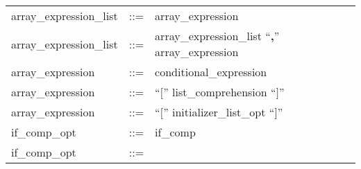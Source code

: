\documentclass[11pt]{article}
\begin{document}
\begin{longtable}{lrl}
array\_expression\_list                    & ::= &
  \begin{minipage}[t]{\rulerhs}
    \raggedright
    array\_expression
  \end{minipage}                                                             \\
array\_expression\_list                    & ::= &
  \begin{minipage}[t]{\rulerhs}
    \raggedright
    array\_expression\_list ``{\bf ,}'' array\_expression
  \end{minipage}                                                             \\
array\_expression                          & ::= &
  \begin{minipage}[t]{\rulerhs}
    \raggedright
    conditional\_expression
  \end{minipage}                                                             \\
array\_expression                          & ::= &
  \begin{minipage}[t]{\rulerhs}
    \raggedright
    ``{\bf $[$}'' list\_comprehension ``{\bf $]$}''
  \end{minipage}                                                             \\
array\_expression                          & ::= &
  \begin{minipage}[t]{\rulerhs}
    \raggedright
    ``{\bf $[$}'' initializer\_list\_opt ``{\bf $]$}''
  \end{minipage}                                                             \\
if\_comp\_opt                              & ::= &
  \begin{minipage}[t]{\rulerhs}
    \raggedright
    if\_comp
  \end{minipage}                                                             \\
if\_comp\_opt                              & ::= &
  \begin{minipage}[t]{\rulerhs}
    \raggedright
    

\end{minipage}
\end{longtable}
\end{document}
